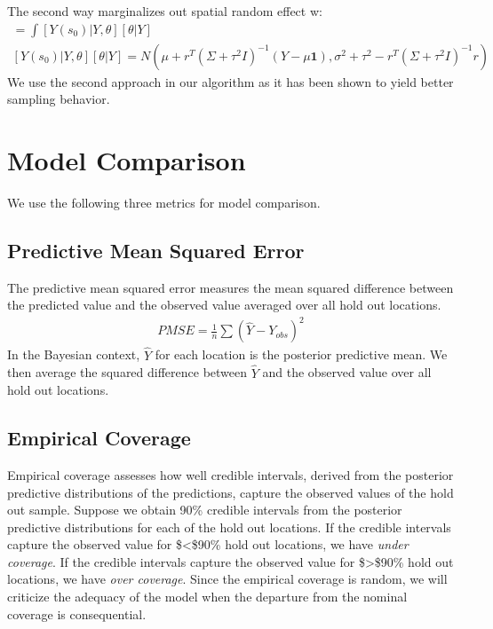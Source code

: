 \documentclass[12pt,twoside]{dukestatscithesis}
\theoremstyle{definition}
\theoremstyle{definition}
\theoremstyle{definition}
\theoremstyle{remark}
\begin{document}
The second way marginalizes out spatial random effect w:
\begin{gather*}
[Y(s_0)|Y] = \int [Y(s_0)|Y,\theta][\theta|Y]\\
[Y(s_0)|Y,\theta][\theta|Y] = N(\mu + r^{T}(\Sigma + \tau^2I)^{-1}(Y-\mu\textbf{1}), \sigma^2+\tau^2-r^{T}(\Sigma+\tau^2I)^{-1}r)
\end{gather*}
We use the second approach in our algorithm as it has been shown to
yield better sampling behavior.

\chapter{Model Comparison}\label{model-comparison}

We use the following three metrics for model comparison.

\section{Predictive Mean Squared
Error}\label{predictive-mean-squared-error}

The predictive mean squared error measures the mean squared difference
between the predicted value and the observed value averaged over all
hold out locations.
\begin{eqnarray*}
PMSE=\frac{1}{n}\sum(\hat{Y} - Y_{obs})^2
\end{eqnarray*}
In the Bayesian context, \(\hat{Y}\) for each location is the posterior
predictive mean. We then average the squared difference between
\(\hat{Y}\) and the observed value over all hold out locations.

\section{Empirical Coverage}\label{empirical-coverage}

Empirical coverage assesses how well credible intervals, derived from
the posterior predictive distributions of the predictions, capture the
observed values of the hold out sample. Suppose we obtain 90\% credible
intervals from the posterior predictive distributions for each of the
hold out locations. If the credible intervals capture the observed value
for \$\textless{}\$90\% hold out locations, we have
\textit{under coverage}. If the credible intervals capture the observed
value for \$\textgreater{}\$90\% hold out locations, we have
\textit{over coverage}. Since the empirical coverage is random, we will
criticize the adequacy of the model when the departure from the nominal
coverage is consequential.
\end{document}
